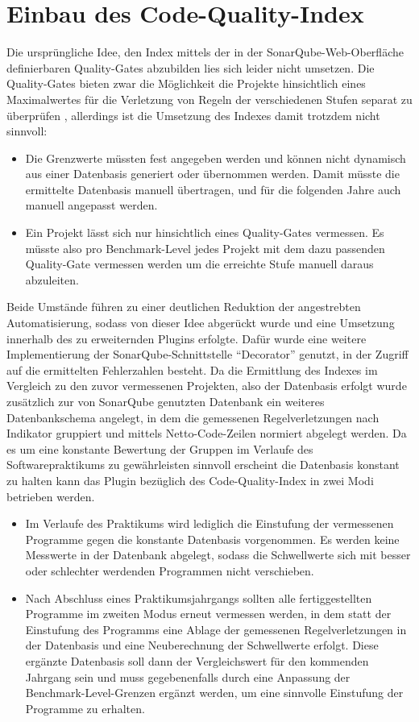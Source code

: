 \documentclass[da,ngerman]{stthesis}
\begin{document}
		\section{Einbau des Code-Quality-Index}
			Die ursprüngliche Idee, den Index mittels der in der SonarQube-Web-Oberfläche definierbaren Quality-Gates abzubilden lies sich leider nicht umsetzen. Die Quality-Gates bieten zwar die Möglichkeit die Projekte hinsichtlich eines Maximalwertes für die Verletzung von Regeln der verschiedenen Stufen separat zu überprüfen \cite{QualityGates}, allerdings ist die Umsetzung des Indexes damit trotzdem nicht sinnvoll:
			\begin{itemize}
				\item Die Grenzwerte müssten fest angegeben werden und können nicht dynamisch aus einer Datenbasis generiert oder übernommen werden. Damit müsste die ermittelte Datenbasis manuell übertragen, und für die folgenden Jahre auch manuell angepasst werden.
				\item Ein Projekt lässt sich nur hinsichtlich eines Quality-Gates vermessen. Es müsste also pro Benchmark-Level jedes Projekt mit dem dazu passenden Quality-Gate vermessen werden um die erreichte Stufe manuell daraus abzuleiten.
			\end{itemize}
			Beide Umstände führen zu einer deutlichen Reduktion der angestrebten Automatisierung, sodass von dieser Idee abgerückt wurde und eine Umsetzung innerhalb des zu erweiternden Plugins erfolgte. Dafür wurde eine weitere Implementierung der SonarQube-Schnittstelle "`Decorator"' genutzt, in der Zugriff auf die ermittelten Fehlerzahlen besteht. \newline
			Da die Ermittlung des Indexes im Vergleich zu den zuvor vermessenen Projekten, also der Datenbasis erfolgt wurde zusätzlich zur von SonarQube genutzten Datenbank ein weiteres Datenbankschema angelegt, in dem die gemessenen Regelverletzungen nach Indikator gruppiert und mittels Netto-Code-Zeilen normiert abgelegt werden. Da es um eine konstante Bewertung der Gruppen im Verlaufe des Softwarepraktikums zu gewährleisten sinnvoll erscheint die Datenbasis konstant zu halten kann das Plugin bezüglich des Code-Quality-Index in zwei Modi betrieben werden. 
			\begin{itemize}
				\item Im Verlaufe des Praktikums wird lediglich die Einstufung der vermessenen Programme gegen die konstante Datenbasis vorgenommen. Es werden keine Messwerte in der Datenbank abgelegt, sodass die Schwellwerte sich mit besser oder schlechter werdenden Programmen nicht verschieben.
				\item Nach Abschluss eines Praktikumsjahrgangs sollten alle fertiggestellten Programme im zweiten Modus erneut vermessen werden, in dem statt der Einstufung des Programms eine Ablage der gemessenen Regelverletzungen in der Datenbasis und eine Neuberechnung der Schwellwerte erfolgt. Diese ergänzte Datenbasis soll dann der Vergleichswert für den kommenden Jahrgang sein und muss gegebenenfalls durch eine Anpassung der Benchmark-Level-Grenzen ergänzt werden, um eine sinnvolle Einstufung der Programme zu erhalten.	
			\end{itemize}	
\end{document}
